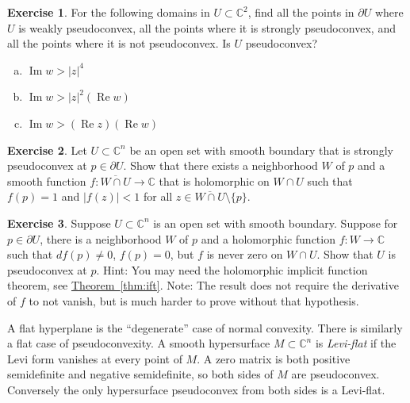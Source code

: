 \documentclass[12pt,openany]{book}
\renewcommand{\Re}{\operatorname{Re}}
\renewcommand{\Im}{\operatorname{Im}}
\newcommand{\sabs}[1]{\lvert {#1} \rvert}
\newcommand{\C}{{\mathbb{C}}}
\newcommand{\myindex}[1]{#1\index{#1}}
\theoremstyle{plain}
\theoremstyle{remark}
\theoremstyle{definition}
\newenvironment{exbox}{%
    \def\FrameCommand{\vrule width 1pt \relax\hspace {10pt}}%
    \MakeFramed {\advance \hsize -\width \FrameRestore }%
}{%
    \endMakeFramed
}
\newenvironment{exparts}{%
    \leavevmode\begin{enumerate}[a),noitemsep,topsep=0pt,parsep=0pt,partopsep=0pt]
}{%
    \end{enumerate}
}
\theoremstyle{exercise}
\newtheorem{exercise}{Exercise}[section]
\theoremstyle{example}
\newcommand{\thmref}[1]{\hyperref[#1]{Theorem~\ref*{#1}}}
\begin{document}
\begin{exbox}
\begin{exercise}
\pagebreak[2]
For the following domains in $U \subset \C^2$,
find all the
points in $\partial U$ where $U$ is weakly pseudoconvex, all the points
where it is strongly pseudoconvex, and all the points where it is
not pseudoconvex.  Is $U$ pseudoconvex?
\begin{exparts}
\item
$\Im w > \sabs{z}^4$
\item
$\Im w > \sabs{z}^2(\Re w)$
\item
$\Im w > (\Re z)(\Re w)$
\pagebreak[2]
\end{exparts}
\end{exercise}

\begin{exercise}
Let $U \subset \C^n$ be an open set with smooth boundary that is
strongly pseudoconvex at $p \in \partial U$.  Show that there
exists a neighborhood $W$ of $p$ and a smooth function $f \colon
\overline{W \cap U} \to \C$ that is holomorphic on $W \cap U$
such that $f(p)=1$ and $\sabs{f(z)} < 1$ for all
$z \in \overline{W \cap U} \setminus \{ p \}$.
\end{exercise}

\begin{exercise}
Suppose $U \subset \C^n$ is an open set with smooth boundary.  Suppose
for $p \in \partial U$, there is a neighborhood $W$ of $p$
and a holomorphic function $f \colon W \to
\C$ such that $df(p) \not= 0$, $f(p) = 0$, but
$f$ is never zero on $W \cap U$.  Show that $U$ is pseudoconvex
at $p$.  Hint: You may need the holomorphic implicit function theorem, see
\thmref{thm:ift}.
Note: The result does not require the derivative of $f$ to not vanish, but is
much harder to prove without that hypothesis.
\end{exercise}
\end{exbox}

A flat hyperplane is the ``degenerate'' case of normal convexity.
There is similarly a flat case of pseudoconvexity.  A smooth hypersurface
$M \subset \C^n$ is \emph{\myindex{Levi-flat}} if the Levi form
vanishes at every point of $M$.  A zero matrix is both positive semidefinite
and negative semidefinite, so both sides of $M$ are pseudoconvex.
Conversely the only hypersurface pseudoconvex from both sides is a
Levi-flat.
\end{document}
